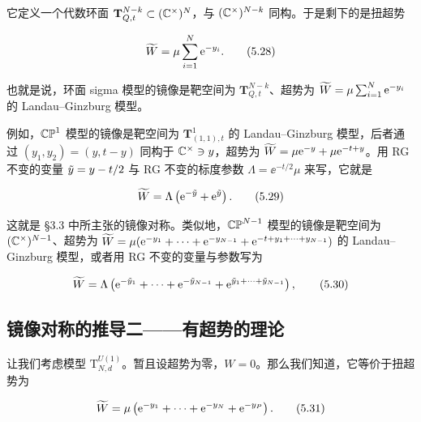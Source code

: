 
它定义一个代数环面 $\mathbf{T}^{N-k}_{Q,t}\subset(\mathbb{C}^\times)^N$，与 $(\mathbb{C}^\times)^{N-k}$ 同构。于是剩下的是扭超势

\begin{equation}
	\widetilde{W} = \mu\sum_{i=1}^{N}\mathrm{e}^{-y_i}. \tag{5.28}
\end{equation}

也就是说，环面 sigma 模型的镜像是靶空间为 $\mathbf{T}^{N-k}_{Q,t}$、超势为 $\widetilde{W}=\mu\sum_{i=1}^{N}\mathrm{e}^{-y_i}$ 的 Landau–Ginzburg 模型。

例如，$\mathbb{CP}^1$ 模型的镜像是靶空间为 $\mathbf{T}^1_{(1,1),t}$ 的 Landau–Ginzburg 模型，后者通过 $(y_1,y_2)=(y,t-y)$ 同构于 $\mathbb{C}^\times\ni y$，超势为 $\widetilde{W}=\mu\mathrm{e}^{-y}+\mu\mathrm{e}^{-t+y}$。用 RG 不变的变量 $\tilde y=y-t/2$ 与 RG 不变的标度参数 $\Lambda=\ee^{-t/2}\mu$ 来写，它就是

\begin{equation}
	\widetilde{W} = \Lambda\left(\mathrm{e}^{-\tilde y}+\mathrm{e}^{\tilde y}\right). \tag{5.29}
\end{equation}


这就是 §3.3 中所主张的镜像对称。类似地，$\mathbb{CP}^{N-1}$ 模型的镜像是靶空间为 $(\mathbb{C}^\times)^{N-1}$、超势为 $\widetilde{W}=\mu(\mathrm{e}^{-y_1}+\cdots+\mathrm{e}^{-y_{N-1}}+\mathrm{e}^{-t+y_1+\cdots+y_{N-1}})$ 的 Landau–Ginzburg 模型，或者用 RG 不变的变量与参数写为

\begin{equation}
	\widetilde{W} = \Lambda\left(\mathrm{e}^{-\tilde y_1}+\cdots+\mathrm{e}^{-\tilde y_{N-1}}+\mathrm{e}^{\tilde y_1+\cdots+\tilde y_{N-1}}\right), \tag{5.30}
\end{equation}

\subsection{镜像对称的推导二——有超势的理论}

让我们考虑模型 $\mathrm{T}^{U(1)}_{N,d}$。暂且设超势为零，$W=0$。那么我们知道，它等价于扭超势为

\begin{equation}
	\widetilde{W} = \mu\left(\mathrm{e}^{-y_1}+\cdots+\mathrm{e}^{-y_N}+\mathrm{e}^{-y_P}\right). \tag{5.31}
\end{equation}


